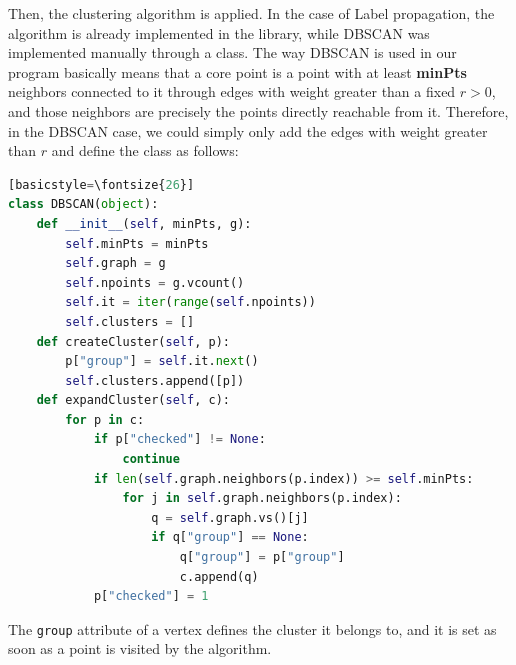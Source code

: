 \documentclass[a4paper,11pt]{book}
\begin{document}
Then, the clustering algorithm is applied. In the case of Label propagation, the algorithm is already implemented in the library, while DBSCAN was implemented manually through a class. The way DBSCAN is used in our program basically means that a core point is a point with at least \textbf{minPts} neighbors connected to it through edges with weight greater than a fixed $r>0$, and those neighbors are precisely the points directly reachable from it. Therefore, in the DBSCAN case, we could simply only add the edges with weight greater than $r$ and define the class as follows:
\begin{center}
\begin{lstlisting}[language=Python][basicstyle=\fontsize{26}]
class DBSCAN(object):
    def __init__(self, minPts, g):
        self.minPts = minPts
        self.graph = g
        self.npoints = g.vcount()
        self.it = iter(range(self.npoints))
        self.clusters = []
    def createCluster(self, p):
        p["group"] = self.it.next()
        self.clusters.append([p])
    def expandCluster(self, c):
        for p in c:
            if p["checked"] != None:
                continue
            if len(self.graph.neighbors(p.index)) >= self.minPts:
                for j in self.graph.neighbors(p.index):
                    q = self.graph.vs()[j]
                    if q["group"] == None:
                        q["group"] = p["group"]
                        c.append(q)
            p["checked"] = 1
\end{lstlisting}
\end{center}
The \lstinline!group! attribute of a vertex defines the cluster it belongs to, and it is set as soon as a point is visited by the algorithm.\\
\end{document}
